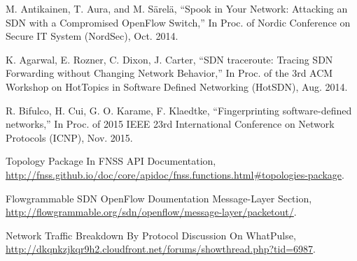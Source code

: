 \documentclass[conference]{IEEEtran}
\begin{document}
\begin{thebibliography}{1}
M. Antikainen, T. Aura, and M. Särelä,
``Spook in Your Network: Attacking an SDN with a Compromised OpenFlow Switch,'' In Proc. of Nordic Conference on Secure IT System (NordSec), Oct. 2014.

K. Agarwal, E. Rozner, C. Dixon, J. Carter,
``SDN traceroute: Tracing SDN Forwarding without Changing Network Behavior,'' In Proc. of the 3rd ACM Workshop on HotTopics in Software Defined Networking (HotSDN), Aug. 2014.

R. Bifulco, H. Cui, G. O. Karame, F. Klaedtke,
``Fingerprinting software-defined networks,'' In Proc. of 2015 IEEE 23rd International Conference on Network Protocols (ICNP), Nov. 2015.

Topology Package In FNSS API Documentation, \url{http://fnss.github.io/doc/core/apidoc/fnss.functions.html#topologies-package}.

Flowgrammable SDN OpenFlow Doumentation Message-Layer Section, \url{http://flowgrammable.org/sdn/openflow/message-layer/packetout/}.

Network Traffic Breakdown By Protocol Discussion On WhatPulse, \url{http://dkqnkzjkqr9h2.cloudfront.net/forums/showthread.php?tid=6987}.

\end{thebibliography}
\end{document}
